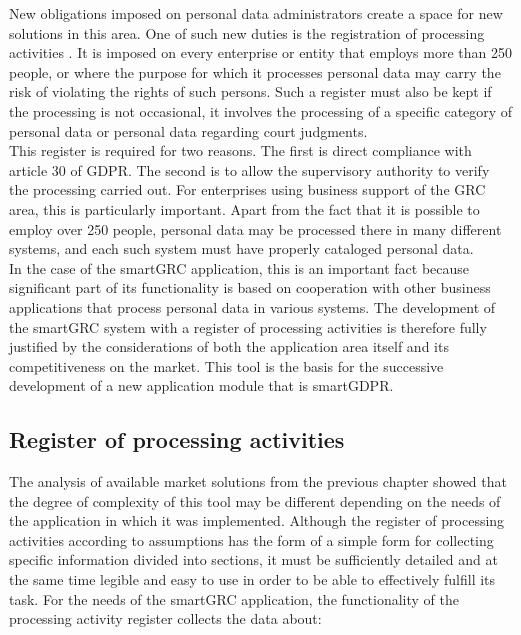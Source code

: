 \documentclass[en, noamssymb]{mgr}
\begin{document}
New obligations imposed on personal data administrators create a space for new solutions in this area. One of such new duties is the registration of processing activities \cite{rodo_art30}. It is imposed on every enterprise or entity that employs more than 250 people, or where the purpose for which it processes personal data may carry the risk of violating the rights of such persons. Such a register must also be kept if the processing is not occasional, it involves the processing of a specific category of personal data or personal data regarding court judgments.\\
\indent This register is required for two reasons. The first is direct compliance with article 30 of GDPR. The second is to allow the supervisory authority to verify the processing carried out. For enterprises using business support of the GRC area, this is particularly important. Apart from the fact that it is possible to employ over 250 people, personal data may be processed there in many different systems, and each such system must have properly cataloged personal data.\\
\indent In the case of the smartGRC application, this is an important fact because significant part of its functionality is based on cooperation with other business applications that process personal data in various systems. The development of the smartGRC system with a register of processing activities is therefore fully justified by the considerations of both the application area itself and its competitiveness on the market. This tool is the basis for the successive development of a new application module that is smartGDPR.
 
\subsection{Register of processing activities}

The analysis of available market solutions from the previous chapter showed that the degree of complexity of this tool may be different depending on the needs of the application in which it was implemented. Although the register of processing activities according to assumptions has the form of a simple form for collecting specific information divided into sections, it must be sufficiently detailed and at the same time legible and easy to use in order to be able to effectively fulfill its task. For the needs of the smartGRC application, the functionality of the processing activity register collects the data about:
\end{document}
